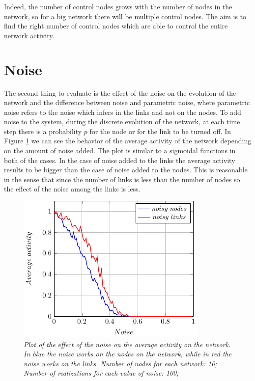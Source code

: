 Indeed, the number of control nodes grows with the number of nodes in the network, so for a big network there will be multiple control nodes. The aim is to find the right number of control nodes which are able to control the entire network activity.




\section{Noise}
The second thing to evaluate is the effect of the noise on the evolution of the network and the difference between noise and parametric noise, where parametric noise refers to the noise which infers in the links and not on the nodes.
To add noise to the system, during the discrete evolution of the network, at each time step there is a probability $p$ for the node or for the link to be turned off.
In Figure \ref{fig:noise} we can see the behavior of the average activity of the network depending on the amount of noise added. The plot is similar to a sigmoidal functions in both of the cases. In the case of noise added to the links the average activity results to be bigger than the case of noise added to the nodes. This is reasonable in the sense that since the number of links is less than the number of nodes so the effect of the noise among the links is less.
\begin{figure}[h]
\centering
\includegraphics[scale=1.]{images/noise.pdf}
\caption{\emph{Plot of the effect of the noise on the average activity on the network. In blue the noise works on the nodes on the network, while in red the noise works on the links. Number of nodes for each network: 10; Number of realizations for each value of noise: 100; }}
\label{fig:noise}
\end{figure}


